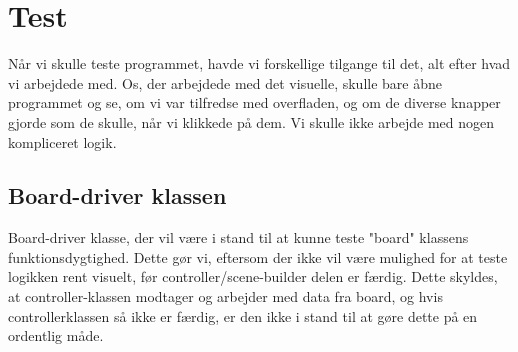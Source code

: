\section{Test}
Når vi skulle teste programmet, havde vi forskellige tilgange til det, alt efter hvad vi arbejdede med. Os, der arbejdede med det visuelle, skulle bare åbne programmet og se, om vi var tilfredse med overfladen, og om de diverse knapper gjorde som de skulle, når vi klikkede på dem. Vi skulle ikke arbejde med nogen kompliceret logik. 
\subsection{Board-driver klassen}
Board-driver klasse, der vil være i stand til at kunne teste "board" klassens funktionsdygtighed. Dette gør vi, eftersom der ikke vil være mulighed for at teste logikken rent visuelt, før controller/scene-builder delen er færdig. Dette skyldes, at controller-klassen modtager og arbejder med data fra board, og hvis controllerklassen så ikke er færdig, er den ikke i stand til at gøre dette på en ordentlig måde.